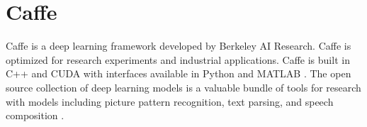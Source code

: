 \section{Caffe}

Caffe is a deep learning framework developed by Berkeley AI Research. 
Caffe is optimized for research experiments and industrial applications. 
Caffe is built in C++ and CUDA with interfaces available in Python and 
MATLAB \cite{hid-sp18-404-EvanShelhamer2017}. The open source collection 
of deep learning models is a valuable bundle of tools for research with 
models including picture pattern recognition, text parsing, and speech 
composition \cite{hid-sp18-404-jia2014caffe}. 
